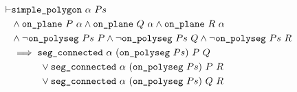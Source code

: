 \begin{align*}
\vdash &\code{simple\_polygon}\ \alpha\ Ps\\
       &\wedge \code{on\_plane}\ P\ \alpha \wedge \code{on\_plane}\ Q\ \alpha \wedge \code{on\_plane}\ R\ \alpha\\
       &\wedge \neg\code{on\_polyseg}\ Ps\ P\wedge \neg\code{on\_polyseg}\ Ps\ Q\wedge \neg\code{on\_polyseg}\ Ps\ R\\
       &\implies \code{seg\_connected}\ \alpha\ (\code{on\_polyseg}\ Ps)\ P\ Q\\
       &\qquad\quad\vee \code{seg\_connected}\ \alpha\ (\code{on\_polyseg}\ Ps)\ P\ R\\
       &\qquad\quad\vee \code{seg\_connected}\ \alpha\ (\code{on\_polyseg}\ Ps)\ Q\ R
\end{align*}

